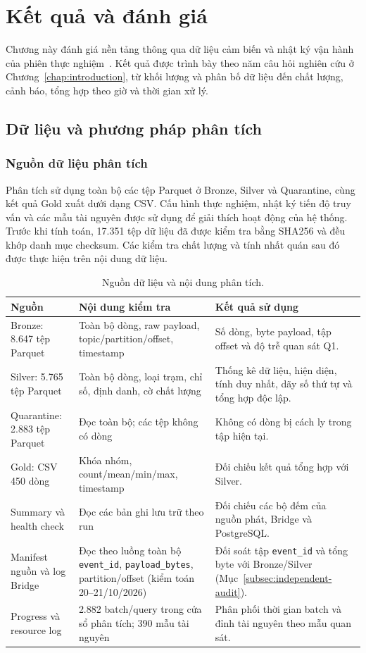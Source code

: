\chapter{Kết quả và đánh giá}
\label{chap:results}

Chương này đánh giá nền tảng thông qua dữ liệu cảm biến và nhật ký vận hành của phiên thực nghiệm~\cite{bigdata_run_archive}. Kết quả được trình bày theo năm câu hỏi nghiên cứu ở Chương~\ref{chap:introduction}, từ khối lượng và phân bố dữ liệu đến chất lượng, cảnh báo, tổng hợp theo giờ và thời gian xử lý.

\section{Dữ liệu và phương pháp phân tích}

\subsection{Nguồn dữ liệu phân tích}
Phân tích sử dụng toàn bộ các tệp Parquet ở Bronze, Silver và Quarantine, cùng kết quả Gold xuất dưới dạng CSV. Cấu hình thực nghiệm, nhật ký tiến độ truy vấn và các mẫu tài nguyên được sử dụng để giải thích hoạt động của hệ thống. Trước khi tính toán, 17.351 tệp dữ liệu đã được kiểm tra bằng SHA256 và đều khớp danh mục checksum. Các kiểm tra chất lượng và tính nhất quán sau đó được thực hiện trên nội dung dữ liệu.

\begin{table}[H]
\centering
\caption{Nguồn dữ liệu và nội dung phân tích.}
\label{tab:evidence-scope}
\small
\begin{tabularx}{\textwidth}{l X X}
\toprule
\textbf{Nguồn} & \textbf{Nội dung kiểm tra} & \textbf{Kết quả sử dụng} \\
\midrule
Bronze: 8.647 tệp Parquet & Toàn bộ dòng, raw payload, topic/partition/offset, timestamp & Số dòng, byte payload, tập offset và độ trễ quan sát Q1. \\
Silver: 5.765 tệp Parquet & Toàn bộ dòng, loại trạm, chỉ số, định danh, cờ chất lượng & Thống kê dữ liệu, hiện diện, tính duy nhất, dãy số thứ tự và tổng hợp độc lập. \\
Quarantine: 2.883 tệp Parquet & Đọc toàn bộ; các tệp không có dòng & Không có dòng bị cách ly trong tập hiện tại. \\
Gold: CSV 450 dòng & Khóa nhóm, count/mean/min/max, timestamp & Đối chiếu kết quả tổng hợp với Silver. \\
Summary và health check & Đọc các bản ghi lưu trữ theo run & Đối chiếu các bộ đếm của nguồn phát, Bridge và PostgreSQL. \\
Manifest nguồn và log Bridge & Đọc theo luồng toàn bộ \texttt{event\_id}, \texttt{payload\_bytes}, partition/offset (kiểm toán 20--21/10/2026) & Đối soát tập \texttt{event\_id} và tổng byte với Bronze/Silver (Mục~\ref{subsec:independent-audit}). \\
Progress và resource log & 2.882 batch/query trong cửa sổ phân tích; 390 mẫu tài nguyên & Phân phối thời gian batch và đỉnh tài nguyên theo mẫu quan sát. \\
\bottomrule
\end{tabularx}
\end{table}

